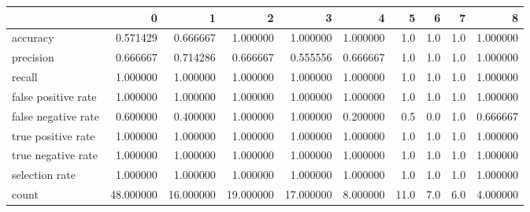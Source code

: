 \begin{tabular}{lrrrrrrrrr}
\toprule
{} &          0 &          1 &          2 &          3 &         4 &     5 &    6 &    7 &         8 \\
\midrule
accuracy            &   0.571429 &   0.666667 &   1.000000 &   1.000000 &  1.000000 &   1.0 &  1.0 &  1.0 &  1.000000 \\
precision           &   0.666667 &   0.714286 &   0.666667 &   0.555556 &  0.666667 &   1.0 &  1.0 &  1.0 &  1.000000 \\
recall              &   1.000000 &   1.000000 &   1.000000 &   1.000000 &  1.000000 &   1.0 &  1.0 &  1.0 &  1.000000 \\
false positive rate &   1.000000 &   1.000000 &   1.000000 &   1.000000 &  1.000000 &   1.0 &  1.0 &  1.0 &  1.000000 \\
false negative rate &   0.600000 &   0.400000 &   1.000000 &   1.000000 &  0.200000 &   0.5 &  0.0 &  1.0 &  0.666667 \\
true positive rate  &   1.000000 &   1.000000 &   1.000000 &   1.000000 &  1.000000 &   1.0 &  1.0 &  1.0 &  1.000000 \\
true negative rate  &   1.000000 &   1.000000 &   1.000000 &   1.000000 &  1.000000 &   1.0 &  1.0 &  1.0 &  1.000000 \\
selection rate      &   1.000000 &   1.000000 &   1.000000 &   1.000000 &  1.000000 &   1.0 &  1.0 &  1.0 &  1.000000 \\
count               &  48.000000 &  16.000000 &  19.000000 &  17.000000 &  8.000000 &  11.0 &  7.0 &  6.0 &  4.000000 \\
\bottomrule
\end{tabular}
